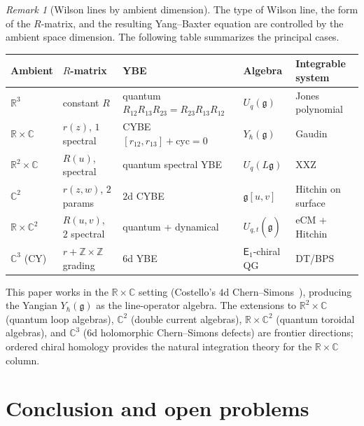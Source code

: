 \documentclass[11pt,reqno]{amsart}
\theoremstyle{definition}
\theoremstyle{remark}
\newtheorem{remark}[theorem]{Remark}
\newcommand{\Eone}{\mathsf{E}_{1}}
\newcommand{\fg}{\mathfrak{g}}
\newcommand{\CC}{\mathbb{C}}
\newcommand{\RR}{\mathbb{R}}
\newcommand{\ZZ}{\mathbb{Z}}
\numberwithin{equation}{section}
\begin{document}
\begin{remark}[Wilson lines by ambient dimension]
\label{rem:wilson-line-classification}
The type of Wilson line, the form of the $R$-matrix, and
the resulting Yang--Baxter equation are controlled by the
ambient space dimension. The following table summarizes the
principal cases.

\begin{center}
\renewcommand{\arraystretch}{1.25}
\small
\begin{tabular}{@{} l l l l l @{}}
\toprule
Ambient & $R$-matrix & YBE & Algebra & Integrable system \\
\midrule
$\RR^3$ & constant $R$ & quantum $R_{12}R_{13}R_{23} = R_{23}R_{13}R_{12}$
  & $U_q(\fg)$ & Jones polynomial \\
$\RR \times \CC$ & $r(z)$, $1$ spectral & CYBE $[r_{12},r_{13}] + \mathrm{cyc} = 0$
  & $Y_\hbar(\fg)$ & Gaudin \\
$\RR^2 \times \CC$ & $R(u)$, spectral & quantum spectral YBE
  & $U_q(L\fg)$ & XXZ \\
$\CC^2$ & $r(z,w)$, $2$ params & $2$d CYBE
  & $\fg[u,v]$ & Hitchin on surface \\
$\RR \times \CC^2$ & $R(u,v)$, $2$ spectral & quantum + dynamical
  & $U_{q,t}(\widehat{\widehat{\fg}})$ & eCM + Hitchin \\
$\CC^3$ (CY) & $r + \ZZ \times \ZZ$ grading & $6$d YBE
  & $\Eone$-chiral QG & DT/BPS \\
\bottomrule
\end{tabular}
\end{center}

\noindent
This paper works in the $\RR \times \CC$ setting
(Costello's $4$d Chern--Simons~\cite{CWY1,CWY2,CFG26,CG17}),
producing the Yangian $Y_\hbar(\fg)$ as the
line-operator algebra.
The extensions to $\RR^2 \times \CC$ (quantum loop
algebras), $\CC^2$ (double current algebras),
$\RR \times \CC^2$ (quantum toroidal algebras), and
$\CC^3$ ($6$d holomorphic Chern--Simons defects) are
frontier directions; ordered chiral homology provides
the natural integration theory for the
$\RR \times \CC$ column.
\end{remark}


\section{Conclusion and open problems}
\label{sec:conclusion}
\end{document}
